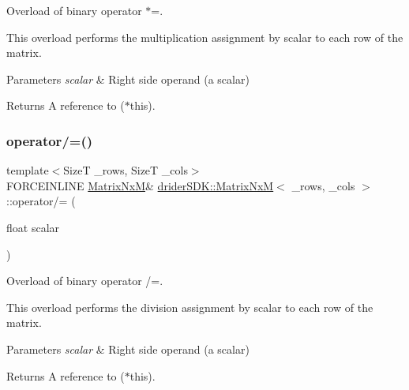 Overload of binary operator $\ast$=.

This overload performs the multiplication assignment by scalar to each row of the matrix.


\begin{DoxyParams}{Parameters}
{\em scalar} & Right side operand (a scalar)\\
\hline
\end{DoxyParams}
\begin{DoxyReturn}{Returns}
A reference to ($\ast$this). 
\end{DoxyReturn}
\mbox{\label{classdrider_s_d_k_1_1_matrix_nx_m_adade639467244032a0d1753abaa59b72}} 
\subsubsection{\texorpdfstring{operator/=()}{operator/=()}}
{\footnotesize\ttfamily template$<$SizeT \+\_\+rows, SizeT \+\_\+cols$>$ \\
F\+O\+R\+C\+E\+I\+N\+L\+I\+NE \hyperlink{classdrider_s_d_k_1_1_matrix_nx_m}{Matrix\+NxM}\& \hyperlink{classdrider_s_d_k_1_1_matrix_nx_m}{drider\+S\+D\+K\+::\+Matrix\+NxM}$<$ \+\_\+rows, \+\_\+cols $>$\+::operator/= (\begin{DoxyParamCaption}\item[{float}]{scalar }\end{DoxyParamCaption})\hspace{0.3cm}{\ttfamily [inline]}}

Overload of binary operator /=.

This overload performs the division assignment by scalar to each row of the matrix.


\begin{DoxyParams}{Parameters}
{\em scalar} & Right side operand (a scalar)\\
\hline
\end{DoxyParams}
\begin{DoxyReturn}{Returns}
A reference to ($\ast$this). 
\end{DoxyReturn}
\mbox{\label{classdrider_s_d_k_1_1_matrix_nx_m_a20df7eaed663a20c7689e1de68b13b0f}} 

